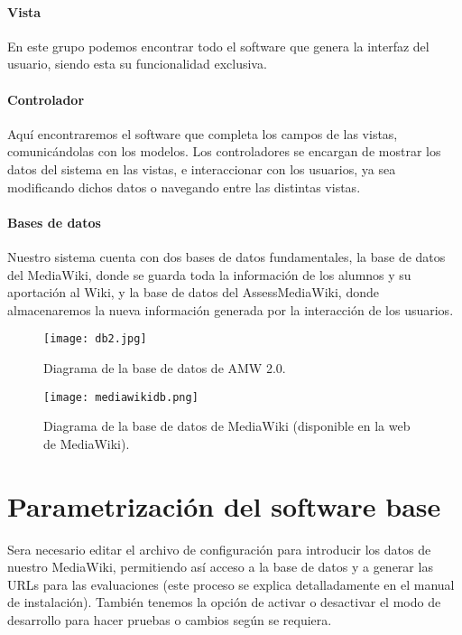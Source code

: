 \paragraph*{Vista}
En este grupo podemos encontrar todo el software que genera la interfaz del usuario, siendo esta su funcionalidad exclusiva.

\paragraph*{Controlador}
Aquí encontraremos el software que completa los campos de las vistas, comunicándolas con los modelos. Los controladores se encargan de mostrar los datos del sistema en las vistas, e interaccionar con los usuarios, ya sea modificando dichos datos o navegando entre las distintas vistas.

\paragraph*{Bases de datos}
Nuestro sistema cuenta con dos bases de datos fundamentales, la base de datos del MediaWiki, donde se guarda toda la información de los alumnos y su aportación al Wiki, y la base de datos del AssessMediaWiki, donde almacenaremos la nueva información generada por la interacción de los usuarios.

\begin{figure}[h!]
	\centering
	\texttt{[image: db2.jpg]}
	\caption{Diagrama de la base de datos de AMW 2.0.}
\end{figure}

\begin{figure}[h!]
	\centering
	\texttt{[image: mediawikidb.png]}
	\caption{Diagrama de la base de datos de MediaWiki (disponible en la web de MediaWiki).}
\end{figure}

\newpage

\section{Parametrización del software base}
Sera necesario editar el archivo de configuración para introducir los datos de nuestro MediaWiki, permitiendo así acceso a la base de datos y a generar las URLs para las evaluaciones (este proceso se explica detalladamente en el manual de instalación). También tenemos la opción de activar o desactivar el modo de desarrollo para hacer pruebas o cambios según se requiera.

